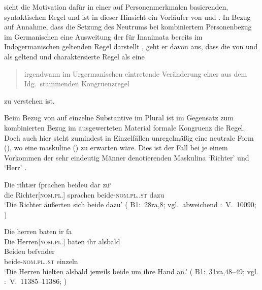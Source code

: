 \citet{askedal1973} sieht die Motivation dafür in einer auf Personenmerkmalen
basierenden, syntaktischen Regel und ist in dieser Hinsicht ein Vorläufer von
\citet{corbett1983} und \citet{wechslerzlatic2003}. In Bezug auf
 Annahme, dass die Setzung des Neutrums bei
kombiniertem Personenbezug im Germanischen eine Ausweitung der
für Inanimata bereits im Indogermanischen geltenden Regel
darstellt \autocite[vgl.~auch][156--157]{hock2008}, geht er davon aus, dass die
von \citet[28]{behaghel1928} und \citet[188]{dal2014} als  geltend und  charaktersierte Regel als eine
\blockcquote[15]{askedal1973}{irgendwann im Urgermanischen
eintretende\textdel{} Veränderung einer aus dem Idg.\ stammenden
Kongruenzregel} zu verstehen ist.

Beim Bezug von  auf einzelne Substantive im Plural ist im Gegensatz
zum kombinierten Bezug im ausgewerteten Material formale Kongruenz die Regel.
Doch auch hier steht zumindest in Einzelfällen unregelmäßig eine
neutrale Form (), wo eine maskuline () zu erwarten
wäre. Dies ist der Fall bei je einem Vorkommen der sehr eindeutig Männer
denotierenden Maskulina  `Richter' und
 `Herr' .

\begin{exe}
\ex \label{ex:richtherriu3}
	\begin{xlist}
	\ex \gll Die rihtær ſprachen beideu {dar zuͦ} \\
			die Richter[\textsc{nom.pl.\MascM}] sprachen
				beide-\textsc{nom.pl.\NeutM.st} dazu \\
		\trans `Die Richter äußerten sich beide dazu'
			(%
				B1:~28ra,8; vgl.~abweichend
				\KC:~V.~10090;
				\cite[267]{schroeder1895}%
			)
		\label{ex:richtherriu3_1}

	\ex \gll Die herren baten ir ſa \\
			Die Herren[\textsc{nom.pl.\MascM}] baten ihr alsbald \\
	\sn \gll Beideu beſvnder \\
			beide-\textsc{nom.pl.\NeutM.st} einzeln \\
		\trans `Die Herren hielten alsbald jeweils beide um ihre Hand an.'
			(%
				B1:~31va,48--49; vgl.
				\KC:~V.~11385--11386;
				\cite[289]{schroeder1895}%
			)
		\label{ex:richtherriu3_2}
	\end{xlist}
\end{exe}

